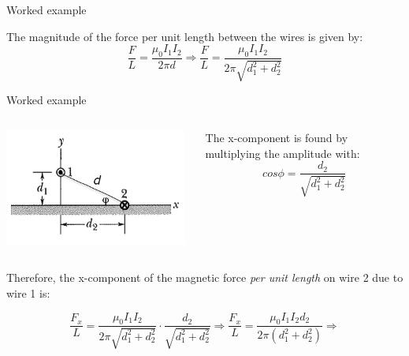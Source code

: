 {\begin{frame}{Worked example}
\vspace{0.3cm}

{\small
 The magnitude of the force per unit length between the wires is given by:
\begin{equation*}
  \frac{F}{L} = \frac{\mu_0 I_{1} I_{2}}{2\pi d} \Rightarrow
  \frac{F}{L} = \frac{\mu_0 I_{1} I_{2}}{2\pi \sqrt{d_1^2+d_2^2}}
\end{equation*}
}
\end{frame}

%
%
%

\begin{frame}{Worked example}

\begin{columns}
  \begin{column}{0.30\textwidth}
    \begin{center}
      \includegraphics[width=0.98\textwidth]{./images/problems/lect5_force_2wires.png}\\
    \end{center}
  \end{column}
  \begin{column}{0.70\textwidth}
   {\small
     The x-component is found by multiplying the amplitude with:
     \begin{equation*}
        cos\phi =  \frac{d_2}{\sqrt{d_1^2+d_2^2}}
     \end{equation*}
   }
  \end{column}
\end{columns}


{\small

Therefore, the x-component of
the magnetic force {\em per unit length} on wire 2 due to wire 1 is:

\begin{equation*}
 \frac{F_x}{L} =
     \frac{\mu_0 I_{1} I_{2}}{2\pi \sqrt{d_1^2+d_2^2}} \cdot
     \frac{d_2}{\sqrt{d_1^2+d_2^2}} \Rightarrow
 \frac{F_x}{L} =
      \frac{\mu_0 I_{1} I_{2} d_2}{2\pi (d_1^2+d_2^2)} \Rightarrow
\end{equation*}

}
\end{frame}}
